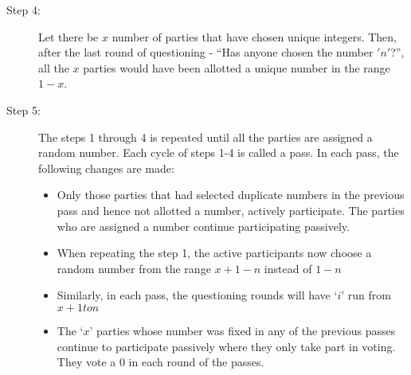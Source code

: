 \documentclass{llncs}
\begin{document}
\begin{description}
\begin{itemize}
\end{itemize} 
\item[Step 4:]\hspace{2mm} Let there be $x$ number of parties that have chosen unique integers. Then, after the last round of questioning - “Has anyone chosen the number $'n'$?”, all the $x$ parties would have been allotted a unique number in the range $1-x$.
 \item[Step 5:]\hspace{2mm} The steps 1 through 4 is repeated until all the parties are assigned a random number. Each cycle of steps 1-4 is called a pass. In each pass, the following changes are made:
 \begin{itemize}
 \item Only those parties that had selected duplicate numbers in the previous pass and hence not allotted a number, actively participate. The parties who are assigned a number continue participating passively.
 \item When repeating the step 1, the active participants now choose a random number from the range $x+1 - n$ instead of $1-n$
 \item Similarly, in each pass, the questioning rounds will have $‘i’$ run from $x+1 to n$
 \item The $‘x’$ parties whose number was fixed in any of the previous passes continue to participate passively where they only take part in voting. They vote a 0 in each round of the passes.
 \end{itemize}
\end{description}
\end{document}
